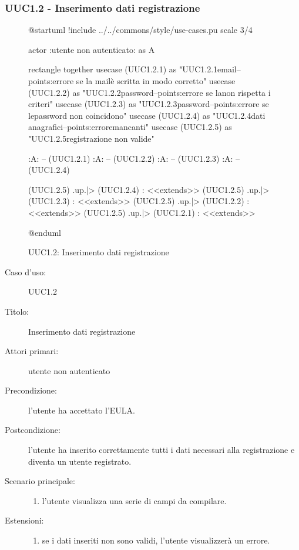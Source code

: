 \documentclass[casi-duso]{subfiles}
\begin{document}
\subsubsection{UUC1.2 - Inserimento dati registrazione}%
\label{subsub:UUC1.2utente}

\begin{figure}[h!] 
  \centering 
  \begin{plantuml}
  @startuml
  !include ../../commons/style/use-cases.pu
  scale 3/4

  actor :utente non autenticato: as A
    
  rectangle {
    together {
      usecase (UUC1.2.1) as "UUC1.2.1\nRegistrazione email\n--\nExtension points:\nVisualizzazione errore se la mail\nnon è scritta in modo corretto"
      usecase (UUC1.2.2) as "UUC1.2.2\nRegistrazione password\n--\nExtension points:\nVisualizzazione errore se la\npassword non rispetta i criteri" 
      usecase (UUC1.2.3) as "UUC1.2.3\nConferma password\n--\nExtension points:\nVisualizzazione errore se le\ndue password non coincidono"     
      usecase (UUC1.2.4) as "UUC1.2.4\nInserimento dati anagrafici\n--\nExtension points:\nVisualizzazione errore\ndati mancanti" 
      usecase (UUC1.2.5) as "UUC1.2.5\nInformazioni registrazione non valide"
    }
  }
    
  :A: -- (UUC1.2.1)
  :A: -- (UUC1.2.2)
  :A: -- (UUC1.2.3)
  :A: -- (UUC1.2.4)
    
  (UUC1.2.5) .up.|> (UUC1.2.4) : <<extends>>
  (UUC1.2.5) .up.|> (UUC1.2.3) : <<extends>>
  (UUC1.2.5) .up.|> (UUC1.2.2) : <<extends>>
  (UUC1.2.5) .up.|> (UUC1.2.1) : <<extends>>
    
  @enduml  
  \end{plantuml} 
  \caption{UUC1.2: Inserimento dati registrazione} 
  \label{fig:uuc1_2} 
\end{figure}

\begin{description}
  \item[Caso d’uso:] UUC1.2
  \item[Titolo:] Inserimento dati registrazione
  \item[Attori primari:] utente non autenticato
  \item[Precondizione:] l'utente ha accettato l'EULA.
  \item[Postcondizione:] l'utente ha inserito correttamente tutti i dati necessari alla registrazione e diventa un utente registrato.
  \item[Scenario principale:]
        \begin{enumerate}
          \item l'utente visualizza una serie di campi da compilare.
        \end{enumerate}
  \item[Estensioni:]
        \begin{enumerate}
          \item se i dati inseriti non sono validi, l'utente visualizzerà un errore.
        \end{enumerate}
\end{description}
\end{document}
